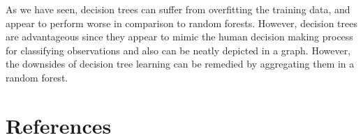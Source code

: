 \documentclass[preprint,12pt]{elsarticle}
\begin{document}
As we have seen, decision trees can suffer from overfitting the training data, and appear to perform worse in comparison to random forests. However, decision trees are advantageous since they appear to mimic the human decision making process for classifying observations and also can be neatly depicted in a graph. However, the downsides of decision tree learning can be remedied by aggregating them in a random forest.


\section{References}








\end{document}
